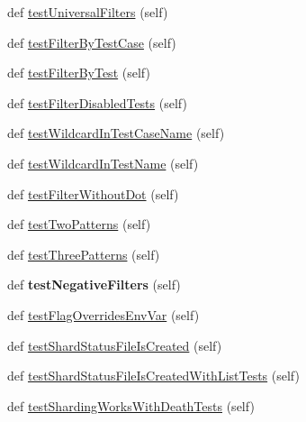 \begin{DoxyCompactItemize}
\item 
def \hyperlink{classgtest__filter__unittest_1_1GTestFilterUnitTest_ae9da48a79483e22e3f986e57de0dee37}{test\+Universal\+Filters} (self)
\item 
def \hyperlink{classgtest__filter__unittest_1_1GTestFilterUnitTest_ac59206c94324afdc09adbe5853856174}{test\+Filter\+By\+Test\+Case} (self)
\item 
def \hyperlink{classgtest__filter__unittest_1_1GTestFilterUnitTest_aaea691324a6c0765403b26a895702a63}{test\+Filter\+By\+Test} (self)
\item 
def \hyperlink{classgtest__filter__unittest_1_1GTestFilterUnitTest_a6d962adae2ee2697b3b92e84b60a795a}{test\+Filter\+Disabled\+Tests} (self)
\item 
def \hyperlink{classgtest__filter__unittest_1_1GTestFilterUnitTest_af855132606c1fa02fb765e8619108114}{test\+Wildcard\+In\+Test\+Case\+Name} (self)
\item 
def \hyperlink{classgtest__filter__unittest_1_1GTestFilterUnitTest_a9b1e6b35e158d7c6d11b8f4d2cb600cb}{test\+Wildcard\+In\+Test\+Name} (self)
\item 
def \hyperlink{classgtest__filter__unittest_1_1GTestFilterUnitTest_a874aea28690300d8c0dc0910304f7ab2}{test\+Filter\+Without\+Dot} (self)
\item 
def \hyperlink{classgtest__filter__unittest_1_1GTestFilterUnitTest_a2563885e647205586b135c5ead55e6ab}{test\+Two\+Patterns} (self)
\item 
def \hyperlink{classgtest__filter__unittest_1_1GTestFilterUnitTest_af4858e153245f0974632fd36dc1dd804}{test\+Three\+Patterns} (self)
\item 
def {\bfseries test\+Negative\+Filters} (self)\hypertarget{classgtest__filter__unittest_1_1GTestFilterUnitTest_aff878809d524797f62e2fe38bbfcc8da}{}\label{classgtest__filter__unittest_1_1GTestFilterUnitTest_aff878809d524797f62e2fe38bbfcc8da}

\item 
def \hyperlink{classgtest__filter__unittest_1_1GTestFilterUnitTest_a81e4256da0e0ad8cb4b764ffd573cc6d}{test\+Flag\+Overrides\+Env\+Var} (self)
\item 
def \hyperlink{classgtest__filter__unittest_1_1GTestFilterUnitTest_a7a2c7b8d758abba0ae883bbb272f344b}{test\+Shard\+Status\+File\+Is\+Created} (self)
\item 
def \hyperlink{classgtest__filter__unittest_1_1GTestFilterUnitTest_a1dac68948f6170e39ae9ee7bca0bc1eb}{test\+Shard\+Status\+File\+Is\+Created\+With\+List\+Tests} (self)
\item 
def \hyperlink{classgtest__filter__unittest_1_1GTestFilterUnitTest_a4b4f7428d9219dff5960968477927626}{test\+Sharding\+Works\+With\+Death\+Tests} (self)
\end{DoxyCompactItemize}


